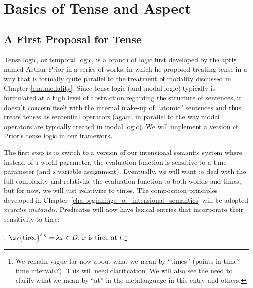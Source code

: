 \chapter{Basics of Tense and Aspect}\label{cha:tense} %


\minitoc

\section{A First Proposal for Tense}

Tense logic, or temporal logic, is a branch of logic first developed by the aptly named Arthur Prior in a series of works, in which he proposed treating tense in a way that is formally quite parallel to the treatment of modality discussed in Chapter \ref{cha:modality}. Since tense logic (and modal logic) typically is formulated at a high level of abstraction regarding the structure of sentences, it doesn't concern itself with the internal make-up of ``atomic'' sentences and thus treats tenses as sentential operators (again, in parallel to the way modal operators are typically treated in modal logic). We will implement a version of Prior's tense logic in our framework.

The first step is to switch to a version of our intensional semantic system where instead of a world parameter, the evaluation function is sensitive to a time parameter (and a variable assignment). Eventually, we will want to deal with the full complexity and relativize the evaluation function to both worlds and times, but for now, we will just relativize to times. The composition principles developed in Chapter~\ref{cha:beginnings_of_intensional_semantics} will be adopted \emph{mutatis mutandis}. Predicates will now have lexical entries that incorporate their sensitivity to time:

\ex. $\sv{\mbox{tired}}^{t,g} = \lambda x \in D.\ x \mbox{ is tired at } t$.\footnote{We remain vague for now about what we mean by ``times'' (points in time? time intervals?). This will need clarification, We will also see the need to clarify what we mean by ``at'' in the metalanguage in this entry and others.}

